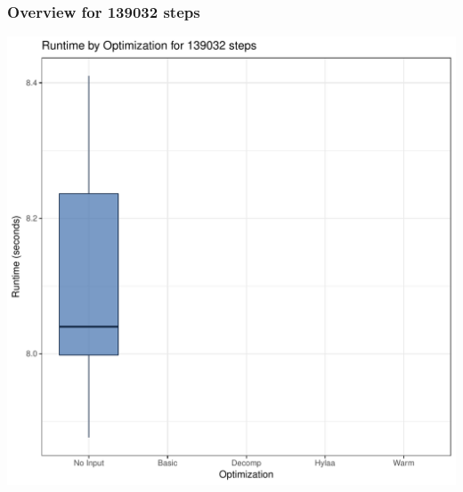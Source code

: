 \documentclass{article}\usepackage[]{graphicx}\usepackage[]{color}
\makeatletter
\def\maxwidth{ %
  \ifdim\Gin@nat@width>\linewidth
    \linewidth
  \else
    \Gin@nat@width
  \fi
}
\newenvironment{knitrout}{}{} %
\makeatother
\begin{document}
\subsubsection{Overview for 139032 steps}
\begin{knitrout}
\color{fgcolor}
\includegraphics[width=\maxwidth]{figure/steps139032-1} 

\end{knitrout}
\end{document}
